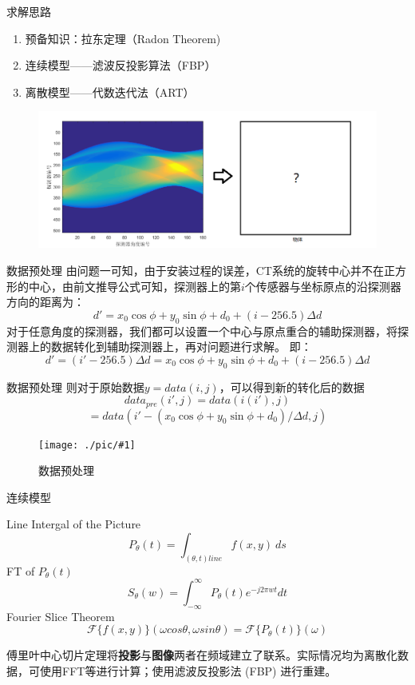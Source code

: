 \documentclass[serif]{beamer} %
\newcommand{\midpic}[2]{  \begin{figure}[H]
\centering
\texttt{[image: ./pic/\#1]}\\
\caption{#2}
\end{figure}}
\begin{document}
\begin{frame}{求解思路}
	\begin{enumerate}
		\item 预备知识：拉东定理（Radon Theorem)
		\item 连续模型——滤波反投影算法（FBP）
		\item 离散模型——代数迭代法（ART）
	\end{enumerate}
	\begin{figure}[H]
		\centering
		\includegraphics[width=1\textwidth]{./pic/pro3.png}\\
		\end{figure}
\end{frame}



\begin{frame}{数据预处理}
	由问题一可知，由于安装过程的误差，CT系统的旋转中心并不在正方形的中心，由前文推导公式可知，探测器上的第\(i\)个传感器与坐标原点的沿探测器方向的距离为：
	\[d' = x_0\cos\phi + y_0\sin\phi + d_0 +  (i - 256.5)\Delta d\]
	对于任意角度的探测器，我们都可以设置一个中心与原点重合的辅助探测器，将探测器上的数据转化到辅助探测器上，再对问题进行求解。
	即：
	\[d' = (i' - 256.5)\Delta d = x_0\cos\phi + y_0\sin\phi + d_0 +  (i - 256.5)\Delta d\]
\end{frame}



\begin{frame}{数据预处理}
	则对于原始数据\( y = data(i,j)\)，可以得到新的转化后的数据
	\[data_{pre}(i',j) = data(i(i'),j)\]
	\[ = data(i' - (x_0\cos\phi + y_0\sin\phi + d_0)/\Delta d,j)\]
	\midpic{datapre3.png}{数据预处理}
\end{frame}



\begin{frame}{连续模型}
	\begin{theorem}	
		Line Intergal of the Picture
		\[ P_\theta (t) = \int_{(\theta, t) line}f(x, y)\ ds \]
		FT of $P_\theta (t)$
		\[S_\theta (w) = \int_{-\infty}^{\infty}P_\theta (t) e^{-j2\pi wt}dt \]
		Fourier Slice Theorem  
		\[\mathcal{F}\{f(x,y)\}(\omega cos\theta,\omega sin\theta)=\mathcal{F}\{P_\theta(t)\}(\omega)\]
	\end{theorem}
	  
	\footnotesize 傅里叶中心切片定理将\textbf{投影}与\textbf{图像}两者在频域建立了联系。实际情况均为离散化数据，可使用FFT等进行计算；使用滤波反投影法 (FBP) 进行重建。
	  
\end{frame}
  
\end{document}
